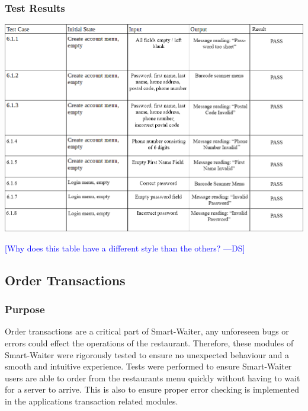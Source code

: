 \documentclass[12pt, titlepage]{article}
\newcommand{\authornote}[3]{\textcolor{#1}{[#3 ---#2]}}
\newcommand{\authornote}[3]{}
\newcommand{\ds}[1]{\authornote{blue}{DS}{#1}}
\begin{document}
\subsubsection{Test Results}
\includegraphics[width=1.2\textwidth]{accountTC.png}

\ds{Why does this table have a different style than the others?}

\subsection{Order Transactions}

\subsubsection{Purpose}
Order transactions are a critical part of Smart-Waiter, any unforeseen bugs or errors could effect the operations of the restaurant. Therefore, these modules of Smart-Waiter were rigorously tested to ensure no unexpected behaviour and a smooth and intuitive experience. Tests were performed to ensure Smart-Waiter users are able to order from the restaurants menu quickly without having to wait for a server to arrive. This is also to ensure proper error checking is implemented in the applications transaction related modules.
\end{document}
